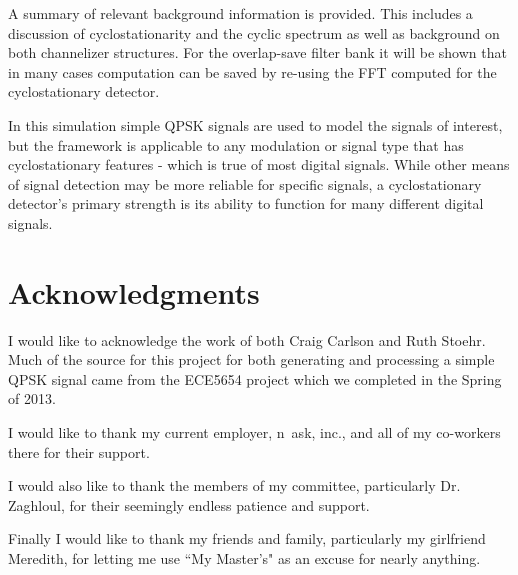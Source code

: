 \documentclass[12pt,dvips]{report}
\begin{document}
A summary of relevant background information is provided.  This includes a
discussion of cyclostationarity and the cyclic spectrum as well as background
on both channelizer structures. For the overlap-save filter bank it will be 
shown that in many cases computation can be saved by re-using the FFT computed
for the cyclostationary detector.

In this simulation simple QPSK signals are used to model the signals of 
interest, but the framework is applicable to any modulation or signal type
that has cyclostationary features - which is true of most digital signals. 
While other means of signal detection may be more reliable for specific signals,
a cyclostationary detector's primary strength is its ability to function for many
different digital signals.

\vfill



\pagebreak

\chapter*{Acknowledgments}
I would like to acknowledge the work of both Craig Carlson and Ruth Stoehr. Much of the source for this project for both generating and processing a simple 
QPSK signal came from the ECE5654 project which we completed in the Spring 
of 2013.

I would like to thank my current employer, n~ask, inc., and all of my co-workers
there for their support.

I would also like to thank the members of my committee, particularly Dr.
Zaghloul, for their seemingly endless patience and support.

Finally I would like to thank my friends and family, particularly my girlfriend Meredith, for letting me use ``My Master's" as an excuse for nearly anything.

\tableofcontents
\pagebreak

\listoffigures
\pagebreak

\listoftables
\pagebreak
\end{document}

